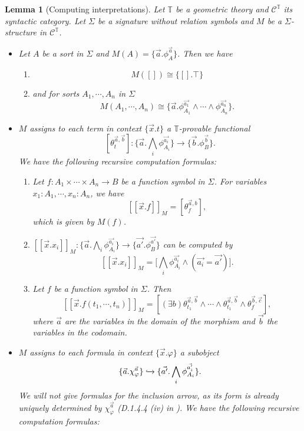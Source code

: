 \documentclass[a4paper]{amsproc}
\theoremstyle{plain}
\newtheorem{lemma}[theorem]{Lemma}
\theoremstyle{definition}
\theoremstyle{remark}
\numberwithin{equation}{section}
\newcommand{\ldoub}{[\![ }
\newcommand{\rdoub}{]\!]}
\begin{document}
\begin{lemma} [Computing interpretations] \label{interpretations}
Let $\mathbb{T}$ be a geometric theory and $\mathcal{C}^{\mathbb{T}}$ its syntactic category. Let $\Sigma$ be a signature without relation symbols and $M$ be a $\Sigma$-structure in $\mathcal{C}^{\mathbb{T}}$.
\begin{itemize}
\item Let $A$ be a sort in $\Sigma$ and $M(A) = \{\vec{a} . \phi_A^{\vec{a}}\}$. Then we have
\begin{enumerate}
\item
\[
M([]) \cong \{[] . \top\}
\]
\item and for sorts $A_1, \cdots, A_n$ in $\Sigma$
\[
M(A_1, \cdots, A_n) \cong \{\vec{a} . \phi_{A_1}^{\vec{a_1}} \wedge \cdots \wedge \phi_{A_n}^{\vec{a_n}}\} .
\]
\end{enumerate}
\item $M$ assigns to each term in context $\{\vec{x} . t\}$ a $\mathbb{T}$-provable functional
\[
[\theta_t^{\vec{a}, \vec{b}}]: \big \{ \vec{a} . \bigwedge_i \phi_{A_i}^{\vec{a_i}} \big \} \to \{\vec{b} . \phi_B^{\vec{b}}\} .
\]
We have the following recursive computation formulas:
\begin{enumerate}
\item Let $f: A_1 \times \cdots \times A_n \to B$ be a function symbol in $\Sigma$.  For variables $x_1 :A_1, \cdots, x_n: A_n$, we have
\[
\ldoub \vec{x} . f\rdoub_M = [\theta_f^{\vec{a}, b}] , 
\]
which is given by $M(f)$.
\item $\ldoub\vec{x} . x_i \rdoub_M: \big \{ \vec{a} . \bigwedge_i \phi_{A_i}^{\vec{a_i}} \big \} \to \{\vec{a'} . \phi_B^{\vec{a'}}\}$ can be computed by
\[
\ldoub\vec{x} . x_i \rdoub_M = \big [ \bigwedge_i \phi_{A_i}^{\vec{a_i}} \wedge (\vec{a_i} = \vec{a'})\big ] .
\]
\item Let $f$ be a function symbol in $\Sigma$. Then
\[
\ldoub \vec{x} . f(t_1, \cdots, t_n) \rdoub_M = [(\exists b) \theta_{t_1}^{\vec{a}, \vec{b}} \wedge \cdots \wedge \theta_{t_1}^{\vec{a}, \vec{b}} \wedge \theta_f^{\vec{b}, \vec{c}}],
\]
where $\vec{a}$ are the variables in the domain of the morphism and $\vec{b}$ the variables in the codomain.
\end{enumerate}
\item $M$ assigns to each formula in context $\{\vec{x} . \varphi \}$ a subobject
\[
\{\vec{a} . \chi_{\varphi}^{\vec{a}} \} \xhookrightarrow{} \{ \vec{a'} . \bigwedge_i \phi_{A_i}^{\vec{a'_i}}\} .
\]
We will not give formulas for the inclusion arrow, as its form is already uniquely determined by $\chi_{\varphi}^{\vec{a}}$ (D.1.4.4 (iv) in \cite{elephant}). We have the following recursive computation formulas:

\end{itemize}
\end{lemma}
\end{document}
